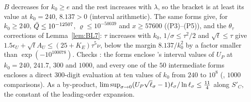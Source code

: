 $B$ decreases for $k_0\ge e$ and the rest increases with $\lambda$, so the bracket is at least its value at $k_0=240$, $8.137>0$ (interval arithmetic).
The same forms give, for $k_0\ge240$, $\bar Q\le10^{-12507}$, $\varrho\le10^{-50039}$ and $x\ge57600$ ((P3)--(P5)), and the $\theta_\tau$ corrections of Lemma~\ref{lem:BL7}:
$\tau$ increases with $k_0$, $1/\sigma\le\tau^2/2$ and $\sqrt t\le\tau$ give $1.5\epsilon_U+\sqrt tA_U\le(25+K_E)\tau^5\nu$, below the margin
$8.137/k_0^2$ by a factor smaller than $\exp(-10^{100078})$. Checks \numst: the forms enclose 's interval values of $U_P$ at $k_0=240$, $241.7$, $300$ and
$1000$, and every one of the $50$ intermediate forms encloses a direct $300$-digit evaluation at ten values of $k_0$ from $240$ to $10^8$ (, $1000$ comparisons). As a by-product, $\limsup_{\sigma\to0}(U_P\sqrt\ls-1)\ls/\ln\ls\le\frac{11}4$ along $S'_C$, the constant of the leading-order expansion.
